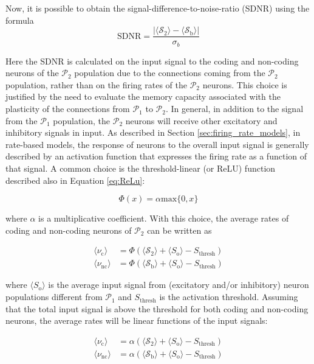 \documentclass[a4paper, 12pt, twoside, openright]{book}
\newcommand{\popI}{\mathcal{P}_1}
\newcommand{\popII}{\mathcal{P}_2}
\newcommand{\SII}{\mathcal{S}_\text{2}}
\newcommand{\Sb}{\mathcal{S}_\text{b}}
\begin{document}
Now, it is possible to obtain the signal-difference-to-noise-ratio (SDNR) using the formula
\begin{equation}
\label{eq:SDNR}
    \text{SDNR} = \dfrac{|\langle \SII \rangle - \langle \Sb \rangle |}{\sigma_b}
\end{equation}

Here the SDNR is calculated on the input signal to the coding and non-coding neurons of the $\popII$ population due to the connections coming from the $\popII$ population, rather than on the firing rates of the $\popII$ neurons.
This choice is justified by the need to evaluate the memory capacity associated with the plasticity of the connections from $\popI$ to $\popII$.
In general, in addition to the signal from the $\popI$ population, the $\popII$ neurons will receive other excitatory and inhibitory signals in input.
As described in Section \ref{sec:firing_rate_models}, in rate-based models, the response of neurons to the overall input signal is generally described by an activation function that expresses the firing rate as a function of that signal.
A common choice is the threshold-linear (or ReLU) function described also in Equation \eqref{eq:ReLu}:

\begin{equation}
\Phi(x) = \alpha \text{max}\{ 0, x\}
\end{equation}

where $\alpha$ is a multiplicative coefficient. With this choice,
the average rates of coding and non-coding neurons of $\popII$ can be written as

\begin{equation}
\begin{split}
\langle\nu_\text{c}\rangle &=
    \Phi(\langle\SII\rangle + \langle S_\text{o}\rangle - S_\text{thresh}) \\
\langle\nu_\text{nc}\rangle &=
    \Phi(\langle\Sb\rangle + \langle S_\text{o}\rangle - S_\text{thresh})
\end {split}
\end{equation}

where $\langle S_\text{o}\rangle$ is the average input signal from (excitatory and/or inhibitory) neuron populations
different from $\popI$ and $S_\text{thresh}$ is the activation threshold.
Assuming that the total input signal is above the threshold for both coding and non-coding neurons, the average rates will be linear functions of the input signals:

\begin{equation}
\begin{split}
\langle\nu_\text{c}\rangle &=
    \alpha(\langle\SII\rangle + \langle S_\text{o}\rangle - S_\text{thresh}) \\
\langle\nu_\text{nc}\rangle &=
    \alpha(\langle\Sb\rangle + \langle S_\text{o}\rangle - S_\text{thresh})
\end {split}
\end{equation}
\end{document}
